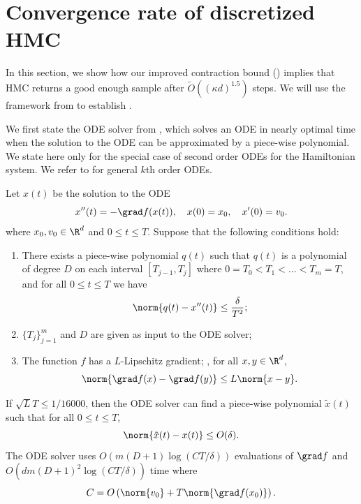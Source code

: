 \section{Convergence rate of discretized HMC}
In this section, we show how our improved contraction bound () implies that HMC returns a good enough sample after $\tilde{O}((\kappa d)^{1.5})$ steps. We will use the framework from \cite{LSV18} to establish .

We first state the ODE solver from \cite{LSV18}, which solves an ODE in nearly optimal time when the solution to the ODE can be approximated by a piece-wise polynomial. We state here only for the special case of second order ODEs for the Hamiltonian system. We refer to \cite{LSV18} for general $k$th order ODEs.

\begin{theorem}
	\label{thm:ODE_solver}
	Let $x(t)$ be the solution to the ODE
	\begin{equation}
	x''(t) = -\grad f(x(t)), \quad x(0) = x_0, \quad x'(0) = v_0.
	\end{equation}
	where $x_0,v_0 \in \R^d$ and $0\le t\le T$. Suppose that the following conditions hold:
	\begin{enumerate}
		\item There exists a piece-wise polynomial $q(t)$ such that $q(t)$ is a polynomial of degree $D$ on each interval $[T_{j-1},T_j]$ where $0=T_0 < T_1 < \dots <T_m = T$, and for all $0\le t\le T$ we have
		\begin{equation}
		\norm{q(t) - x''(t)} \le \frac{\delta}{T^2};
		\end{equation}
		\item $\{T_j\}_{j=1}^m$ and $D$ are given as input to the ODE solver;
		\item The function $f$ has a $L$-Lipschitz gradient; \ie, for all $x,y\in\R^d$,
		\begin{equation}
		\norm{\grad f(x) - \grad f(y)} \le L \norm{x-y}.
		\end{equation}
	\end{enumerate}
	If $\sqrt{L} T \le 1/16000$, then the ODE solver can find a piece-wise polynomial $\tilde{x}(t)$ such that for all $0\le t\le T$,
	\begin{equation}
	\norm{\tilde{x}(t) - x(t)} \le O(\delta).
	\end{equation}
	The ODE solver uses $O(m(D+1) \log(CT/\delta))$ evaluations of $\grad f$ and $O(dm (D+1)^2 \log(CT/\delta))$ time where
	\begin{equation}
	C = O\left(\norm{v_0} + T\norm{\grad f(x_0)} \right).
	\end{equation}
\end{theorem}


